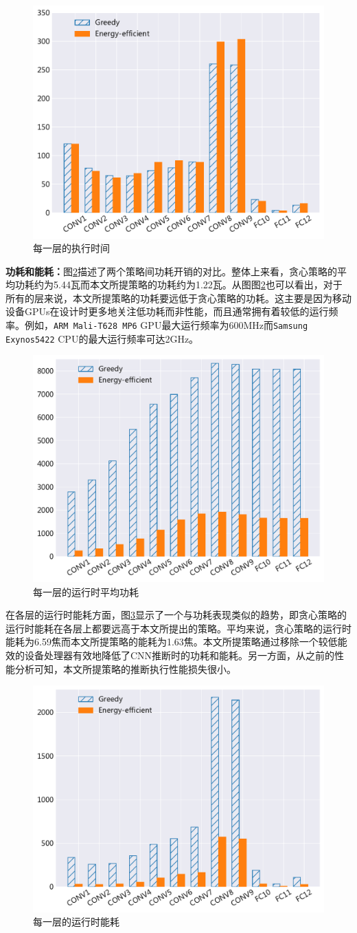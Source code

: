 \begin{figure}[htbp]
    \centering
    \includegraphics[height=0.4\textwidth]{figures/hc_time.pdf}
    \caption{每一层的执行时间}\label{figure:figure32}
\end{figure}

\textbf{功耗和能耗：}图\ref{figure:figure33}描述了两个策略间功耗开销的对比。整体上来看，贪心策略的平均功耗约为5.44瓦而本文所提策略的功耗约为1.22瓦。从图图\ref{figure:figure33}也可以看出，对于所有的层来说，本文所提策略的功耗要远低于贪心策略的功耗。这主要是因为移动设备GPUs在设计时更多地关注低功耗而非性能，而且通常拥有着较低的运行频率。例如，\texttt{ARM Mali-T628 MP6} GPU最大运行频率为600MHz而\texttt{Samsung Exynos5422} CPU的最大运行频率可达2GHz\cite{hardkernel.com}。

\begin{figure}[htbp]
    \centering
    \includegraphics[height=0.4\textwidth]{figures/hc_power.pdf}
    \caption{每一层的运行时平均功耗}\label{figure:figure33}
\end{figure}

在各层的运行时能耗方面，图\ref{figure:figure34}显示了一个与功耗表现类似的趋势，即贪心策略的运行时能耗在各层上都要远高于本文所提出的策略。平均来说，贪心策略的运行时能耗为6.59焦而本文所提策略的能耗为1.63焦。本文所提策略通过移除一个较低能效的设备处理器有效地降低了CNN推断时的功耗和能耗。另一方面，从之前的性能分析可知，本文所提策略的推断执行性能损失很小。

\begin{figure}[htbp]
    \centering
    \includegraphics[height=0.4\textwidth]{figures/hc_energy.pdf}
    \caption{每一层的运行时能耗}\label{figure:figure34}
\end{figure}

